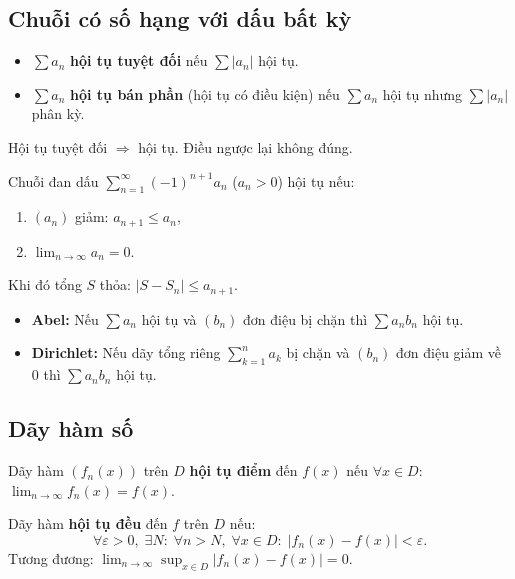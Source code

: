 \documentclass[12pt,a4paper]{article}
\begin{document}
\subsection{Chuỗi có số hạng với dấu bất kỳ}

\begin{dinhnghia}
  \begin{itemize}
    \item $\sum a_n$ \textbf{hội tụ tuyệt đối} nếu $\sum |a_n|$ hội tụ.
    \item $\sum a_n$ \textbf{hội tụ bán phần} (hội tụ có điều kiện) nếu $\sum a_n$ hội tụ nhưng $\sum |a_n|$ phân kỳ.
  \end{itemize}
  Hội tụ tuyệt đối $\Rightarrow$ hội tụ. Điều ngược lại không đúng.
\end{dinhnghia}

\begin{dinhly}[title={Tiêu chuẩn Leibniz (chuỗi đan dấu)}]
  Chuỗi đan dấu $\displaystyle\sum_{n=1}^{\infty} (-1)^{n+1} a_n$ ($a_n > 0$) hội tụ nếu:
  \begin{enumerate}
    \item $(a_n)$ giảm: $a_{n+1} \le a_n$,
    \item $\displaystyle\lim_{n \to \infty} a_n = 0$.
  \end{enumerate}
  Khi đó tổng $S$ thỏa: $|S - S_n| \le a_{n+1}$.
\end{dinhly}

\begin{dinhly}[title={Tiêu chuẩn Abel và Dirichlet}]
  \begin{itemize}
    \item \textbf{Abel:} Nếu $\sum a_n$ hội tụ và $(b_n)$ đơn điệu bị chặn thì $\sum a_n b_n$ hội tụ.
    \item \textbf{Dirichlet:} Nếu dãy tổng riêng $\sum_{k=1}^n a_k$ bị chặn và $(b_n)$ đơn điệu giảm về $0$ thì $\sum a_n b_n$ hội tụ.
  \end{itemize}
\end{dinhly}

\subsection{Dãy hàm số}

\begin{dinhnghia}
  Dãy hàm $(f_n(x))$ trên $D$ \textbf{hội tụ điểm} đến $f(x)$ nếu $\forall x \in D$: $\displaystyle\lim_{n \to \infty} f_n(x) = f(x)$.

  Dãy hàm \textbf{hội tụ đều} đến $f$ trên $D$ nếu:
  \[
    \forall \varepsilon > 0,\; \exists N:\; \forall n > N,\; \forall x \in D:\; |f_n(x) - f(x)| < \varepsilon.
  \]
  Tương đương: $\displaystyle\lim_{n \to \infty} \sup_{x \in D} |f_n(x) - f(x)| = 0$.
\end{dinhnghia}
\end{document}
